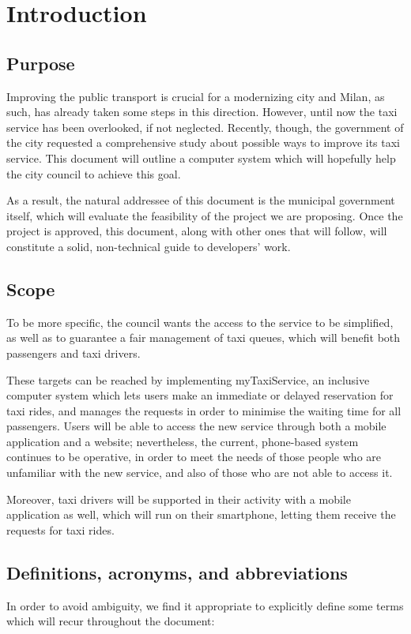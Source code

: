 \chapter{Introduction}


\section{Purpose}
Improving the public transport is crucial for a modernizing city and Milan, as such, has already taken some steps in this direction. However, until now the taxi service has been overlooked, if not neglected. Recently, though, the government of the city requested a comprehensive study about possible ways to improve its taxi service. This document will outline a computer system which will hopefully help the city council to achieve this goal.

As a result, the natural addressee of this document is the municipal government itself, which will evaluate the feasibility of the project we are proposing. Once the project is approved, this document, along with other ones that will follow, will constitute a solid, non-technical guide to developers' work.


\section{Scope}
To be more specific, the council wants the access to the service to be simplified, as well as to guarantee a fair management of taxi queues, which will benefit both passengers and taxi drivers. 

These targets can be reached by implementing myTaxiService, an inclusive computer system which lets users make an immediate or delayed reservation for taxi rides, and manages the requests in order to minimise the waiting time for all passengers. Users will be able to access the new service through both a mobile application and a website; nevertheless, the current, phone-based system continues to be operative, in order to meet the needs of those people who are unfamiliar with the new service, and also of those who are not able to access it. 

Moreover, taxi drivers will be supported in their activity with a mobile application as well, which will run on their smartphone, letting them receive the requests for taxi rides.


\section{Definitions, acronyms, and abbreviations}	%
In order to avoid ambiguity, we find it appropriate to explicitly define some terms which will recur throughout the document:

